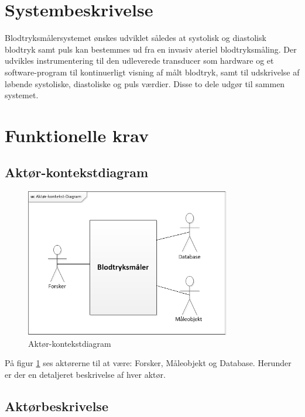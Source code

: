 \section{Systembeskrivelse}
Blodtryksmålersystemet ønskes udviklet således at systolisk og diastolisk blodtryk samt puls kan bestemmes ud fra en invasiv ateriel blodtryksmåling. Der udvikles instrumentering til den udleverede transducer som hardware og et software-program til kontinuerligt visning af målt blodtryk, samt til udskrivelse af løbende systoliske, diastoliske og puls værdier. Disse to dele udgør til sammen systemet. 

\section{Funktionelle krav}
 

\subsection{Aktør-kontekstdiagram}


\begin{figure}[H]
	\centering
	\includegraphics[width=0.8\textwidth]{Figurer/Aktor-kontekst-diagram}
	\caption{Aktør-kontekstdiagram}
	\label{fig:aktoerbeskrivelse}
\end{figure}
På figur \ref{fig:aktoerbeskrivelse} ses aktørerne til at være: Forsker, Måleobjekt og Database. Herunder er der en detaljeret beskrivelse af hver aktør.


\subsection{Aktørbeskrivelse}

